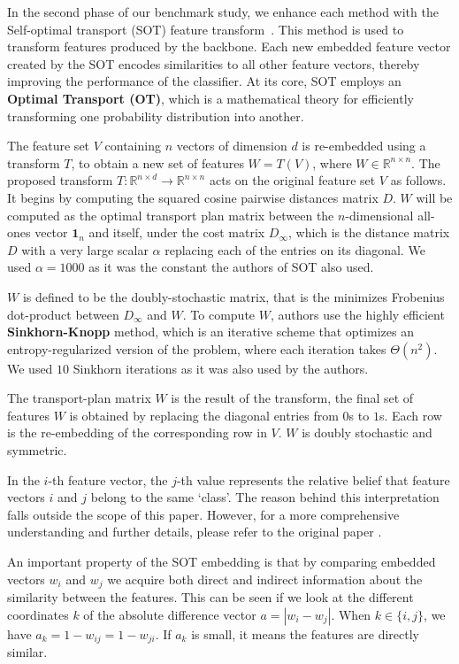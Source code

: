 \documentclass{article}
\begin{document}
In the second phase of our benchmark study, we enhance each method with the Self-optimal transport (SOT) feature transform~\cite{sot}. This method is used to transform features produced by the backbone. Each new embedded feature vector created by the SOT encodes similarities to all other feature vectors, thereby improving the performance of the classifier.  At its core, SOT employs an \textbf{Optimal Transport (OT)}, which is a mathematical theory for efficiently transforming one probability distribution into another. 

The feature set $V$ containing $n$ vectors of dimension $d$ is re-embedded using a transform $T$, to obtain a new set of features $W = T(V)$, where $W \in \mathbb{R}^{n \times n}$. The proposed transform $T: \mathbb{R}^{n \times d} \rightarrow \mathbb{R}^{n \times n}$ acts on the original feature set \( V \) as follows. It begins by computing the squared cosine pairwise distances matrix $D$. $W$ will be computed as the optimal transport plan matrix between the $n$-dimensional all-ones vector $\mathbf{1}_n$ and itself, under the cost matrix $D_{\infty}$, which is the distance matrix $D$  with a very large scalar $\alpha$ replacing each of the entries on its diagonal. We used $\alpha=1000$ as it was the constant the authors of SOT also used.

\( W \) is defined to be the doubly-stochastic matrix, that is the minimizes Frobenius dot-product between $D_{\infty}$ and $W$. To compute $W$, authors use the highly efficient \textbf{Sinkhorn-Knopp} method, which is an iterative scheme that optimizes an entropy-regularized version of the problem, where each iteration takes $\Theta(n^2)$. We used $10$ Sinkhorn iterations as it was also used by the authors.

The transport-plan matrix $W$ is the result of the transform, the final set of features $W$ is obtained by replacing the diagonal entries from $0$s to $1$s. Each row is the re-embedding of the corresponding row in $V$. $W$ is doubly stochastic and symmetric.

In the $i$-th feature vector, the $j$-th value represents the relative belief that feature vectors $i$ and $j$ belong to the same `class'. The reason behind this interpretation falls outside the scope of this paper. However, for a more comprehensive understanding and further details, please refer to the original paper \cite{sot}.

An important property of the SOT embedding is that by comparing embedded vectors $w_i$ and $w_j$ we acquire both direct and indirect information about the similarity between the features. This can be seen if we look at the different coordinates $k$ of the absolute difference vector $a=|w_i - w_j|$. When $k\in\{i,j\}$, we have $a_k = 1 - w_{ij} = 1 - w_{ji}$. If \( a_k \) is small, it means the features are directly similar.
\end{document}
